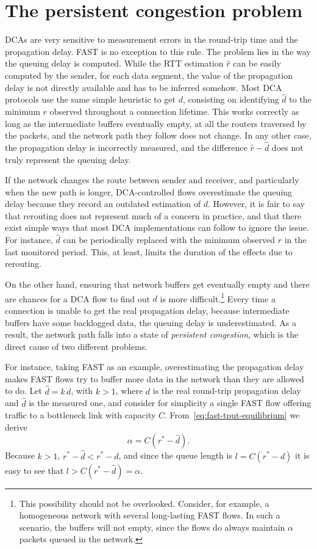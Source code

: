 \documentclass[english,times]{ettauth}
\begin{document}
\section{The persistent congestion problem}
\label{sec:pers-cong-probl}

DCAs are very sensitive to measurement errors in the round-trip time and the
propagation delay. FAST is no exception to this rule. The problem lies in the
way the queuing delay is computed. While the RTT estimation $\hat r$ can be
easily computed by the sender, for each data segment, the value of the
propagation delay is not directly available and has to be inferred somehow.
Most DCA protocols use the same simple heuristic to get $d$, consisting on
identifying $\hat d$ to the minimum $r$ observed throughout a connection
lifetime. This works correctly as long as the intermediate buffers eventually
empty, at all the routers traversed by the packets, and the network path they
follow does not change. In any other case, the propagation delay is
incorrectly measured, and the difference $\hat r - \hat d$ does not truly
represent the queuing delay.

If the network changes the route between sender and receiver, and particularly
when the new path is longer, DCA-controlled flows overestimate the queuing
delay because they record an outdated estimation of $d$. However, it is fair
to say that rerouting does not represent much of a concern in practice, and
that there exist simple ways that most DCA implementations can follow to
ignore the issue. For instance, $\hat d$ can be periodically replaced with the
minimum observed $r$ in the last monitored period. This, at least, limits the
duration of the effects due to rerouting.

On the other hand, ensuring that network buffers get eventually empty and
there are chances for a DCA flow to find out $d$ is more
difficult.\footnote{This possibility should not be overlooked. Consider, for
  example, a homogeneous network with several long-lasting FAST flows. In such
  a scenario, the buffers will not empty, since the flows do always maintain
  $\alpha$ packets queued in the network.} Every time a connection is unable
to get the real propagation delay, because intermediate buffers have some
backlogged data, the queuing delay is underestimated. As a result, the network
path falls into a state of \emph{persistent congestion}, which is the direct
cause of two different problems.

For instance, taking FAST as an example, overestimating the propagation delay
makes FAST flows try to buffer more data in the network than they are allowed
to do. Let $\hat d = k\,d$, with $k > 1$, where $d$ is the real round-trip
propagation delay and $\hat d$ is the measured one, and consider for
simplicity a single FAST flow offering traffic to a bottleneck link with
capacity $C$. From~\eqref{eq:fast-tput-equilibrium} we derive
\begin{equation}
  \label{eq:equilibrium-persistent}
  \alpha = C \left(r^* - \hat d\right).
\end{equation}
Because $k > 1$, $r^* - \hat d < r^* - d$, and since the queue length is
$l = C (r^* - d)$ it is easy to see that $l > C(r^* - \hat d) = \alpha$.
\end{document}
